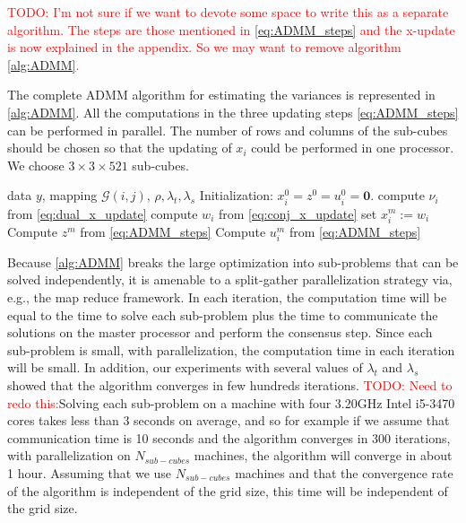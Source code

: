 \documentclass{article}
\newcommand{\attn}[1]{\textcolor{red}{TODO: #1}}
\begin{document}
\attn{I'm not sure if we want to devote some space to write this as a separate algorithm. The steps are those mentioned in \ref{eq:ADMM_steps} and the x-update is now explained in the appendix. So we may want to remove algorithm \ref{alg:ADMM}. }

The complete ADMM algorithm for estimating the variances is
represented in \autoref{alg:ADMM}. All the computations in the three
updating steps \eqref{eq:ADMM_steps} can be performed in parallel. The
number of rows and columns of the sub-cubes should be chosen so that
the updating of $x_i$ could be performed in one processor. We choose
$3\times3\times521$ sub-cubes. 

\begin{algorithm}[tb]
  \caption{ADMM for sparse estimation of variance of spatio-temporal
    data \attn{Fix this}}
  \label{alg:ADMM}
  \begin{algorithmic}
     data $y$, mapping $\mathscr{G}(i,j)$,
    $\rho,\lambda_t,\lambda_s$ 
    \STATE Initialization: $x_i^0=z^0=u_i^0=\textbf{0}$.
    \STATE compute $\nu_i$ from \eqref{eq:dual_x_update}
    \STATE compute $w_i$ from \eqref{eq:conj_x_update}
    \STATE set $x_i^m:=w_i$
    \ENDFOR
    \STATE Compute $z^m$ from  \eqref{eq:ADMM_steps}
    \STATE Compute $u_i^m$ from  \eqref{eq:ADMM_steps}
    \ENDFOR
  \end{algorithmic}
\end{algorithm}

Because \autoref{alg:ADMM} breaks the large optimization into
sub-problems that can be solved independently, it is amenable to a
split-gather parallelization strategy via, e.g., the map reduce framework.
In each iteration, the
computation time will be equal to the time to solve each sub-problem
plus the time to communicate the solutions on the master processor
and perform the consensus step. Since each sub-problem is
small, with parallelization, the computation time in each iteration
will be small. In addition, our experiments with several values of
$\lambda_t$ and $\lambda_s$ showed that the algorithm converges in few
hundreds iterations. 
\attn{Need to redo this:}Solving each sub-problem on a machine with four
3.20GHz Intel i5-3470 cores takes less than 3 seconds on average, and
so for example if we assume that communication time is 10 seconds and
the algorithm converges in 300 iterations, with parallelization on
$N_{sub-cubes}$ machines, the algorithm will converge in about 1
hour. Assuming that we use $N_{sub-cubes}$ machines and that the
convergence rate of the algorithm is independent of the grid size,
this time will be independent of the grid size. 
\end{document}
